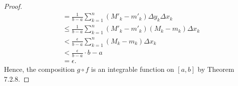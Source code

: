 \begin{enumerate}
\begin{proof}
\begin{align*}
								&=  \frac{ 1 }{ b-a } \sum_{ k=1 }^{ n }  (M'_{k} - m'_{k }) \Delta y_{k} \Delta x_{k } \\
								&\leq \frac{ 1 }{ b-a } \sum_{ k=1 }^{ n } (M'_{k } - m'_{k } )  (M_{k } - m_{k } ) \Delta x_{k } \\
								&< \frac{ \epsilon  }{ b -a  } \sum_{ k=1 }^{ n } (M_{k } - m_{k }) \Delta x_{k } \\
								&< \frac{ \epsilon  }{ b -a  } \cdot b -a  \\
								&= \epsilon.
 	\end{align*}
	Hence, the composition \( g \circ f \) is an integrable function on \( [a,b] \) by Theorem 7.2.8.
	\end{proof}
\end{enumerate}



